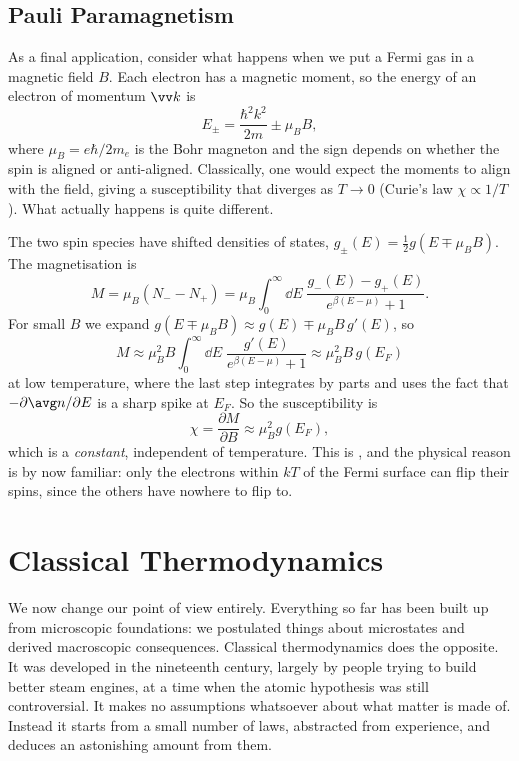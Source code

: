 \subsection{Pauli Paramagnetism}

As a final application, consider what happens when we put a Fermi gas in a magnetic field $B$. Each electron has a magnetic moment, so the energy of an electron of momentum $\vv k$ is
$$
E_\pm = \frac{\hbar^2 k^2}{2m} \pm \mu_B B,
$$
where $\mu_B = e\hbar/2m_e$ is the Bohr magneton and the sign depends on whether the spin is aligned or anti-aligned. Classically, one would expect the moments to align with the field, giving a susceptibility that diverges as $T \to 0$ (Curie's law $\chi \propto 1/T$). What actually happens is quite different.

The two spin species have shifted densities of states, $g_\pm(E) = \tfrac 12 g(E \mp \mu_B B)$. The magnetisation is
$$
M = \mu_B (N_- - N_+) = \mu_B\int_0^\infty \dd E\; \frac{g_-(E) - g_+(E)}{e^{\beta(E-\mu)}+1}.
$$
For small $B$ we expand $g(E \mp \mu_B B) \approx g(E) \mp \mu_B B\, g'(E)$, so
$$
M \approx \mu_B^2 B \int_0^\infty \dd E\; \frac{g'(E)}{e^{\beta(E-\mu)}+1} \approx \mu_B^2 B\, g(E_F)
$$
at low temperature, where the last step integrates by parts and uses the fact that $-\partial\avg n/\partial E$ is a sharp spike at $E_F$. So the susceptibility is
$$
\chi = \frac{\partial M}{\partial B} \approx \mu_B^2 g(E_F),
$$
which is a \emph{constant}, independent of temperature. This is , and the physical reason is by now familiar: only the electrons within $kT$ of the Fermi surface can flip their spins, since the others have nowhere to flip to.

\section{Classical Thermodynamics}

We now change our point of view entirely. Everything so far has been built up from microscopic foundations: we postulated things about microstates and derived macroscopic consequences. Classical thermodynamics does the opposite. It was developed in the nineteenth century, largely by people trying to build better steam engines, at a time when the atomic hypothesis was still controversial. It makes no assumptions whatsoever about what matter is made of. Instead it starts from a small number of laws, abstracted from experience, and deduces an astonishing amount from them.

